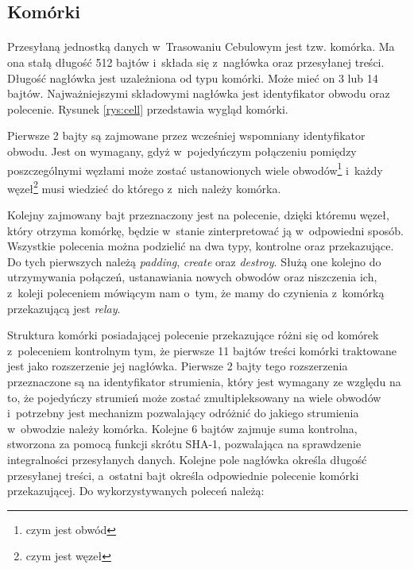 \subsection{Komórki}\paragraph{}
Przesyłaną jednostką danych w~Trasowaniu Cebulowym jest tzw. komórka. Ma ona stałą długość 512 bajtów i~składa się z~nagłówka oraz przesyłanej treści. Długość nagłówka jest uzależniona od typu komórki. Może mieć on 3 lub 14 bajtów. Najważniejszymi składowymi nagłówka jest identyfikator obwodu oraz polecenie. Rysunek \ref{rys:cell} przedstawia wygląd komórki.

Pierwsze 2 bajty są zajmowane przez wcześniej wspomniany identyfikator obwodu. Jest on wymagany, gdyż w~pojedyńczym połączeniu pomiędzy poszczególnymi węzłami może zostać ustanowionych wiele obwodów\footnote{czym jest obwód} i~każdy węzeł\footnote{czym jest węzeł} musi wiedzieć do którego z~nich należy komórka.

Kolejny zajmowany bajt przeznaczony jest na polecenie, dzięki któremu węzeł, który otrzyma komórkę, będzie w~stanie zinterpretować ją w~odpowiedni sposób. Wszystkie polecenia można podzielić na dwa typy, kontrolne oraz przekazujące. Do tych pierwszych należą \textit{padding}, \textit{create} oraz \textit{destroy}. Służą one kolejno do utrzymywania połączeń, ustanawiania nowych obwodów oraz niszczenia ich, z~koleji poleceniem mówiącym nam o~tym, że mamy do czynienia z~komórką przekazującą jest \textit{relay}.

Struktura komórki posiadającej polecenie przekazujące różni się od komórek z~poleceniem kontrolnym tym, że pierwsze 11 bajtów treści komórki traktowane jest jako rozszerzenie jej nagłówka. Pierwsze 2 bajty tego rozszerzenia przeznaczone są na identyfikator strumienia, który jest wymagany ze względu na to, że pojedyńczy strumień może zostać zmultipleksowany na wiele obwodów i~potrzebny jest mechanizm pozwalający odróżnić do jakiego strumienia w~obwodzie należy komórka. Kolejne 6 bajtów zajmuje suma kontrolna, stworzona za pomocą funkcji skrótu SHA-1, pozwalająca na sprawdzenie integralności przesyłanych danych. Kolejne pole nagłówka określa długość przesyłanej treści, a~ostatni bajt określa odpowiednie polecenie komórki przekazującej. Do wykorzystywanych poleceń należą:

